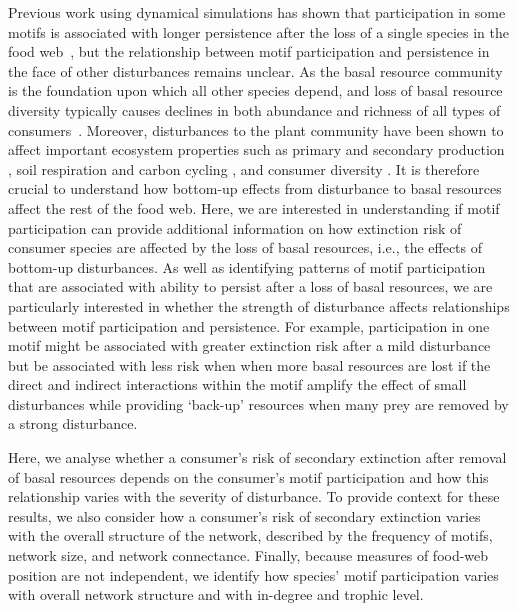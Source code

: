 \documentclass[12pt]{article}
\begin{document}
\begin{spacing}{2.0}
    Previous work using dynamical simulations has shown that participation in some motifs is associated with longer persistence after the loss of a single species in the food web~\citep{Cirtwill2022Oikos}, but the relationship between motif participation and persistence in the face of other disturbances remains unclear.
   As the basal resource community is the foundation upon which all other species depend, and loss of basal resource diversity typically causes declines in both abundance and richness of all types of consumers~\citep{scherber2010bottom,Dobson2009food, Mduma1999food, Georgiadis2007}.
    Moreover, disturbances to the plant community have been shown to affect important ecosystem properties such as primary \citep{Hector1999} and secondary production \citep{borer2012plant}, soil respiration and carbon cycling \citep{chen2019plant}, and consumer diversity \citep{scherber2010bottom, Baiser2016,li2020bottom}.
    It is therefore crucial to understand how bottom-up effects from disturbance to basal resources affect the rest of the food web.  Here, we are interested in understanding if motif participation can provide additional information on how extinction risk of consumer species are affected by the loss of basal resources, i.e., the effects of bottom-up disturbances.
    As well as identifying patterns of motif participation that are associated with ability to persist after a loss of basal resources, we are particularly interested in whether the strength of  disturbance affects relationships between motif participation and persistence.
    For example, participation in one motif might be associated with greater extinction risk after a mild disturbance but be associated with less risk when when more basal resources are lost if the direct and indirect interactions within the motif amplify the effect of small disturbances while providing `back-up' resources when many prey are removed by a strong disturbance.

    
    
    Here, we analyse whether a consumer's risk of secondary extinction after removal of basal resources depends on the consumer's motif participation and how this relationship varies with the severity of disturbance.
    To provide context for these results, we also consider how a consumer's risk of secondary extinction varies with the overall structure of the network, described by the frequency of motifs, network size, and network connectance.
    Finally, because measures of food-web position are not independent, we identify how species' motif participation varies with overall network structure and with in-degree and trophic level.



\end{spacing}
\end{document}
